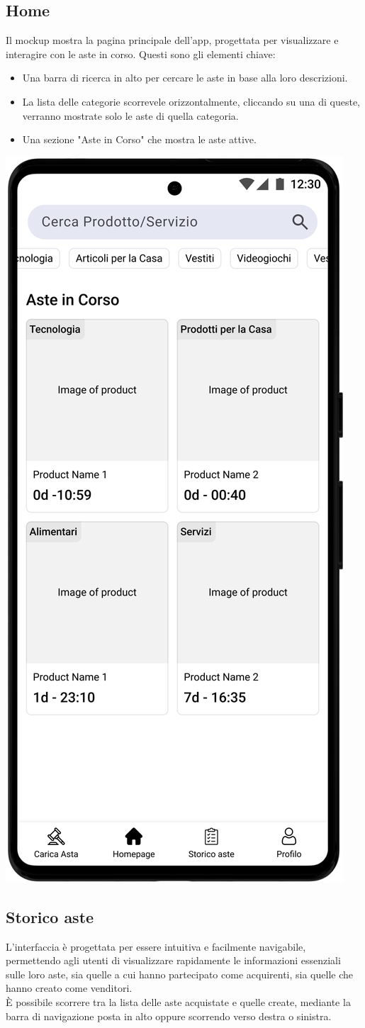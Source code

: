 \newpage
\subsection{Home}
Il mockup mostra la pagina principale dell'app, progettata per visualizzare e interagire con le aste in corso.
Questi sono gli elementi chiave:
\begin{itemize}
	\item Una barra di ricerca in alto per cercare le aste in base alla loro descrizioni.
	\item La lista delle categorie scorrevele orizzontalmente, cliccando su una di queste, verranno mostrate solo le aste di quella categoria.
	\item Una sezione "Aste in Corso" che mostra le aste attive.
\end{itemize}
\begin{center}
	\includegraphics[width=.35\textwidth]{images/mockup/HomePage.png}
\end{center}

\newpage
\subsection{Storico aste}
L'interfaccia è progettata per essere intuitiva e facilmente navigabile, permettendo agli utenti di visualizzare rapidamente le informazioni essenziali sulle loro aste, sia quelle a cui hanno partecipato come acquirenti, sia quelle che hanno creato come venditori.\\
È possibile scorrere tra la lista delle aste acquistate e quelle create, mediante la barra di navigazione posta in alto oppure scorrendo verso destra o sinistra.

